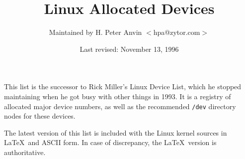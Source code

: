 %
%
\oddsidemargin=0in
\textwidth=6.5in
\topmargin=0in
\headheight=0.5in
\headsep=0.25in
\textheight=7.5in
\footskip=0.75in
\footheight=0.5in
%

\newcommand{\file}{\tt}			%
\newcommand{\hex}{\tt}			%
\newcommand{\ud}{(Under development)}	%
\newcommand{\1}{\({}^1\)}
\newcommand{\2}{\({}^2\)}
\newcommand{\3}{\({}^3\)}
\newcommand{\4}{\({}^4\)}
\newlength{\dig}
\settowidth{\dig}{0}			%
\newcommand{\num}[2]{\makebox[#1\dig][r]{#2}}
\newcommand{\major}[4]{\num{3}{#1}#2 \> #3 \> #4 \\}
\newcommand{\minor}[3]{\> \> \num{3}{#1} \> {\file #2} \> #3 \\}
\newcommand{\minordots}{\> \> \> \dots \\}
\newenvironment{devicelist}%
 {\begin{tabbing}%
000--000 \= blockxxx \= 000 \= {\file /dev/crambamboli} \= foo \kill}%
 {\end{tabbing}}
\newcommand{\link}[4]{{\file #1} \> {\file #2} \> #3 \> #4 \\}
\newcommand{\vlink}[4]{{\file #1} \> {\em #2 \/} \> #3 \> #4 \\}
\newcommand{\node}[3]{{\file #1} \> #2 \> #3 \\}
\newenvironment{nodelist}%
 {\begin{tabbing}%
{\file /dev/crambamboli} \= {\file /proc/self/fd/99} \= symbolicxxx \=
foo \kill}%
 {\end{tabbing}}
%
\title{{\bf Linux Allocated Devices}}
\author{Maintained by H. Peter Anvin $<$hpa@zytor.com$>$}
\date{Last revised: November 13, 1996}
\maketitle
%
\noindent
This list is the successor to Rick Miller's Linux Device List, which
he stopped maintaining when he got busy with other things in 1993.  It
is a registry of allocated major device numbers, as well as the
recommended {\file /dev} directory nodes for these devices.

The latest version of this list is included with the Linux kernel
sources in \LaTeX\ and ASCII form.  In case of discrepancy, the
\LaTeX\ version is authoritative.

